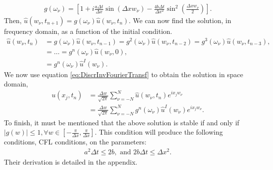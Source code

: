 \begin{questions}
\begin{solution}
\begin{align}
g(\omega_{\nu}) = \left[1+i\frac{a\Delta t}{ \Delta x}\sin\left(\Delta xw_{\nu}\right)-\frac{4b\Delta t}{\Delta x^2}\sin^2\left(\frac{\Delta xw_{\nu}}{2}\right)\right].
\end{align}
Then, $\hat{u}(w_{\nu}, t_{n+1}) = g(\omega_{\nu} )\hat{u}(w_{\nu}, t_n)$. We can now find the solution, in frequency domain, as a function of the initial condition.
\begin{align*}
\hat{u}(w_{\nu}, t_n) &= g(\omega_{\nu} )\hat{u}(w_{\nu}, t_{n-1})= g^2(\omega_{\nu} )\hat{u}(w_{\nu}, t_{n-2})= g^3(\omega_{\nu} )\hat{u}(w_{\nu}, t_{n-3}),\\
&= \dots = g^n(\omega_{\nu} )\hat{u}(w_{\nu}, 0),\\
&= g^n(\omega_{\nu} )\hat{u}^I(w_{\nu}).
\end{align*}
We now use equation \eqref{eq:DiscrInvFourierTransf} to obtain the solution in space domain,
\begin{align}
u(x_j,t_n)&=\frac{\Delta w}{\sqrt{2\pi}}\sum_{\nu=-N}^N \hat{u}(w_{\nu},t_n)e^{ix_jw_{\nu}}\nonumber\\
&= \frac{\Delta w}{\sqrt{2\pi}}\sum_{\nu=-N}^N g^n(\omega_{\nu} )\hat{u}^I(w_{\nu})e^{ix_jw_{\nu}}.
\end{align}
To finish, it must be mentioned that the above solution is stable if and only if $|g(w)|\leq 1, \forall w\in[-\frac{\pi}{\Delta x},\frac{\pi}{\Delta x}]$. This condition will produce the following conditions, CFL conditions, on the parameters:
\begin{align}\label{eq:CFL}
a^2\Delta t \leq 2b,\text{  and  }2b\Delta t\leq\Delta x^2.
\end{align}
Their derivation is detailed in the appendix.
\end{solution}
\end{questions}